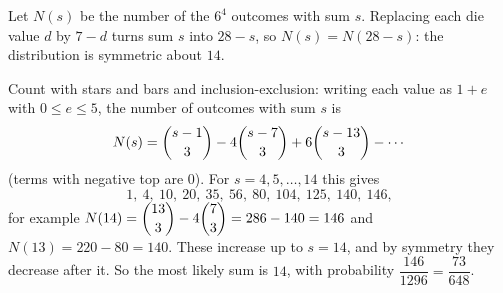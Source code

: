 Let $N(s)$ be the number of the $6^4$ outcomes with sum $s$. Replacing each die value $d$ by $7-d$ turns sum $s$ into $28-s$, so $N(s)=N(28-s)$: the distribution is symmetric about $14$.

Count with stars and bars and inclusion-exclusion: writing each value as $1+e$ with $0\le e\le5$, the number of outcomes with sum $s$ is
\[N(s)=\dbinom{s-1}{3}-4\dbinom{s-7}{3}+6\dbinom{s-13}{3}-\cdots\]
(terms with negative top are $0$). For $s=4,5,\ldots,14$ this gives
\[1,\ 4,\ 10,\ 20,\ 35,\ 56,\ 80,\ 104,\ 125,\ 140,\ 146,\]
for example $N(14)=\dbinom{13}{3}-4\dbinom73=286-140=146$ and $N(13)=220-80=140$. These increase up to $s=14$, and by symmetry they decrease after it. So the most likely sum is $\boxed{14}$, with probability $\dfrac{146}{1296}=\dfrac{73}{648}$.
